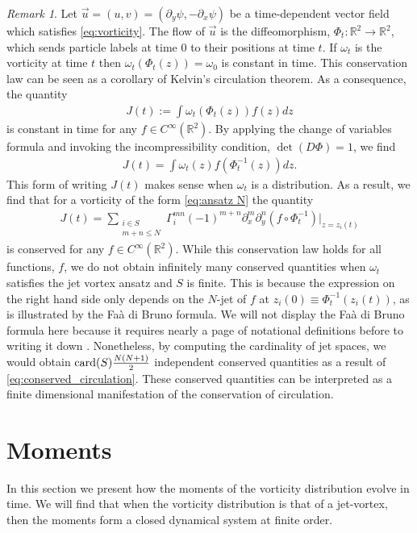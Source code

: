 \documentclass[12pt]{amsart}
\newcommand{\R}{\ensuremath{\mathbb{R}}}
\theoremstyle{remark}
\newtheorem{rmk}[thm]{Remark}
\begin{document}
\begin{rmk} \label{rmk:Kelvin}
	Let $\vec{u} = (u,v) = (\partial_y \psi, - \partial_x \psi)$ be a time-dependent vector field which satisfies \eqref{eq:vorticity}.
	The flow of $\vec{u}$ is the diffeomorphism, $\Phi_t: \mathbb{R}^2 \to \mathbb{R}^2$,
	which sends particle labels at time $0$ to their positions at time $t$.
	If $\omega_t$ is the vorticity at time $t$ then $\omega_t( \Phi_t(z) ) = \omega_0$ is constant in time.
	This conservation law can be seen as a corollary of Kelvin's circulation theorem.
	As a consequence, the quantity
	\begin{align*}
		J(t) := \int \omega_t( \Phi_t(z) ) f(z) dz
	\end{align*}
	is constant in time for any $f \in C^\infty(\R^2)$.
	By applying the change of variables formula and invoking the
	incompressibility condition, $\det(D\Phi) = 1$, we find
	\begin{align*}
		J(t) = \int \omega_t( z) f(\Phi_t^{-1}(z)) dz.
	\end{align*}
	This form of writing $J(t)$ makes sense when $\omega_t$ is a distribution.
	As a result, we find that for a vorticity of the form \eqref{eq:ansatz N} the quantity
	\begin{align}
		J(t) = \sum_{
			\substack{
				i \in S \\
				m+n \leq N
			}
		} \Gamma_i^{mn} (-1)^{m+n} \partial_x^m\partial_y^n( f \circ \Phi_t^{-1}) |_{z = z_i(t)} \label{eq:conserved_circulation}
	\end{align}
	is conserved for any $f \in C^\infty(\R^2)$.
	While this conservation law holds for all functions, $f$, we do not obtain infinitely many conserved
	quantities when $\omega_t$ satisfies the jet vortex ansatz and $S$ is finite.
	This is because the expression on the right hand side only depends on the $N$-jet of $f$ at $z_i(0) \equiv \Phi_t^{-1}(z_i(t) )$,
	as is illustrated by the Fa\`a di Bruno formula.
	We will not display the Fa\`a di Bruno formula here because it requires nearly a page of notational definitions before to writing it down
	\cite{ConstantineSavits1996}.
	Nonetheless, by computing the cardinality of jet spaces, we would obtain ${\rm card}(S) \frac{ N(N+1)}{2}$ independent conserved quantities
	as a result of \eqref{eq:conserved_circulation}.
	These conserved quantities can be interpreted as a finite dimensional manifestation of the conservation of circulation.
\end{rmk}

\section{Moments}
\label{sec:moments}
	In this section we present how the moments of the vorticity distribution evolve in time.
	We will find that when the vorticity distribution is that of a jet-vortex, then the moments form a closed dynamical system at finite order.
	
\end{document}
